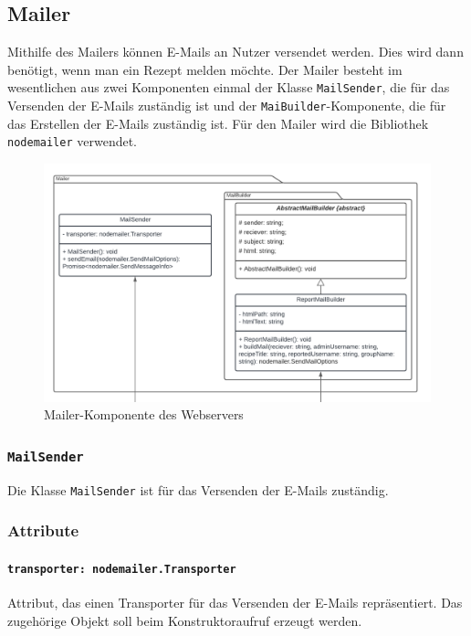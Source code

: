 \documentclass{entwurfsheft}
\begin{document}
\begin{sloppypar}
\newpage

\subsection{Mailer}
Mithilfe des Mailers können E-Mails an Nutzer versendet werden. Dies wird dann benötigt, wenn man ein Rezept melden möchte.
Der Mailer besteht im wesentlichen aus zwei Komponenten einmal der Klasse \texttt{MailSender}, die für das Versenden der E-Mails zuständig ist und der \texttt{MaiBuilder}-Komponente, die für das Erstellen der E-Mails zuständig ist.
Für den Mailer wird die Bibliothek \texttt{nodemailer} verwendet.

\begin{figure}[htp]
    \centering
    \includegraphics[width = 1\textwidth]{images/webserver/mailer.pdf}
    \caption{Mailer-Komponente des Webservers}
    \label{fig:mailer}
\end{figure}

\subsubsection{\texttt{MailSender}}\label{sec:MailSender}
Die Klasse \texttt{MailSender} ist für das Versenden der E-Mails zuständig.

\subsubsection*{Attribute}
\paragraph{\texttt{transporter: nodemailer.Transporter}}
Attribut, das einen Transporter für das Versenden der E-Mails repräsentiert. Das zugehörige Objekt soll beim Konstruktoraufruf erzeugt werden.

\end{sloppypar}
\end{document}
